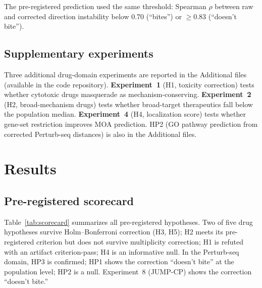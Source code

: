 \documentclass[11pt]{article}
\begin{document}
The pre-registered prediction used the same threshold: Spearman $\rho$
between raw and corrected direction instability below 0.70 (``bites'')
or $\geq 0.83$ (``doesn't bite'').

\subsection{Supplementary experiments}

Three additional drug-domain experiments are reported in the Additional
files (available in the code repository). \textbf{Experiment~1}
(H1, toxicity correction) tests whether cytotoxic drugs masquerade as
mechanism-conserving. \textbf{Experiment~2} (H2, broad-mechanism drugs)
tests whether broad-target therapeutics fall below the population median.
\textbf{Experiment~4} (H4, localization score) tests whether gene-set
restriction improves MOA prediction. HP2 (GO pathway prediction from
corrected Perturb-seq distances) is also in the Additional files.

\section{Results}

\subsection{Pre-registered scorecard}

Table~\ref{tab:scorecard} summarizes all pre-registered hypotheses.
Two of five drug hypotheses survive Holm--Bonferroni correction (H3, H5);
H2 meets its pre-registered criterion but does not survive multiplicity
correction; H1 is refuted with an artifact criterion-pass; H4 is an
informative null.
In the Perturb-seq domain, HP3 is confirmed; HP1 shows the correction
``doesn't bite'' at the population level; HP2 is a null. Experiment~8
(JUMP-CP) shows the correction ``doesn't bite.''
\end{document}
